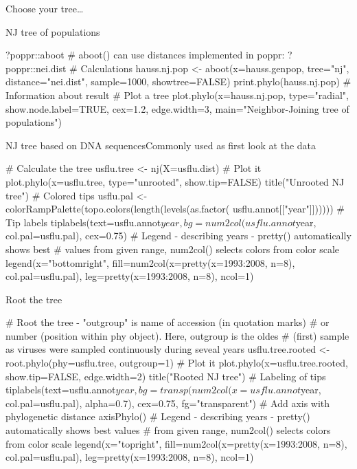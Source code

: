 \documentclass[compress, xelatex, 11pt, xcolor=svgnames, aspectratio=169,
	hyperref={
		bookmarks=true,
		unicode=true,
		colorlinks=true,
		pdftitle={Molecular data in R},
		plainpages=false,
		pdfauthor={Vojtech Zeisek},
		pdfsubject={Course about phylogeny and evolution in R},
		pdfcreator={XeLaTeX},
		pdfkeywords={R, evolution, phylogeny, molecular data},
		linkcolor=Crimson, %
		anchorcolor=Magenta, %
		citecolor=Magenta, %
		filecolor=Magenta, %
		menucolor=Magenta, %
		urlcolor=DodgerBlue, %
		},
	url={hyphens, lowtilde} %
	]{beamer}
\renewcommand{\texttt}[1]{\colorbox{Beige}{{\ttfamily #1}}}
\begin{document}
\begin{frame}{Choose your tree\ldots}
	\begin{center}
		\texttt{[image: nj-upgma-bruvo.png]}
	\end{center}
\end{frame}

\begin{frame}[fragile]{NJ tree of populations}
	\begin{spluscode}
    ?poppr::aboot # aboot() can use distances implemented in poppr:
    ?poppr::nei.dist
    # Calculations
    hauss.nj.pop <- aboot(x=hauss.genpop, tree="nj", distance="nei.dist",
      sample=1000, showtree=FALSE)
    print.phylo(hauss.nj.pop) # Information about result
    # Plot a tree
    plot.phylo(x=hauss.nj.pop, type="radial", show.node.label=TRUE,
      cex=1.2, edge.width=3, main="Neighbor-Joining tree of populations")
	\end{spluscode}
	\begin{center}
		\texttt{[image: nj\_pop.png]}
	\end{center}
\end{frame}

\begin{frame}[fragile]{NJ tree based on DNA sequences}{Commonly used as first look at the data}
	\begin{spluscode}
    # Calculate the tree
    usflu.tree <- nj(X=usflu.dist)
    # Plot it
    plot.phylo(x=usflu.tree, type="unrooted", show.tip=FALSE)
    title("Unrooted NJ tree")
    # Colored tips
    usflu.pal <- colorRampPalette(topo.colors(length(levels(as.factor(
      usflu.annot[["year"]])))))
    # Tip labels
    tiplabels(text=usflu.annot$year, bg=num2col(usflu.annot$year,
      col.pal=usflu.pal), cex=0.75)
    # Legend - describing years - pretty() automatically shows best
    # values from given range, num2col() selects colors from color scale
    legend(x="bottomright", fill=num2col(x=pretty(x=1993:2008, n=8),
      col.pal=usflu.pal), leg=pretty(x=1993:2008, n=8), ncol=1)
	\end{spluscode}
\end{frame}

\begin{frame}[fragile]{Root the tree}
	\begin{spluscode}
    # Root the tree - "outgroup" is name of accession (in quotation marks)
    # or number (position within phy object). Here, outgroup is the oldes
    # (first) sample as viruses were sampled continuously during seveal years
    usflu.tree.rooted <- root.phylo(phy=usflu.tree, outgroup=1)
    # Plot it
    plot.phylo(x=usflu.tree.rooted, show.tip=FALSE, edge.width=2)
    title("Rooted NJ tree")
    # Labeling of tips
    tiplabels(text=usflu.annot$year, bg=transp(num2col(x=usflu.annot$year,
      col.pal=usflu.pal), alpha=0.7), cex=0.75, fg="transparent")
    # Add axis with phylogenetic distance
    axisPhylo()
    # Legend - describing years - pretty() automatically shows best values
    # from given range, num2col() selects colors from color scale
    legend(x="topright", fill=num2col(x=pretty(x=1993:2008, n=8),
      col.pal=usflu.pal), leg=pretty(x=1993:2008, n=8), ncol=1)
	\end{spluscode}
\end{frame}
\end{document}
